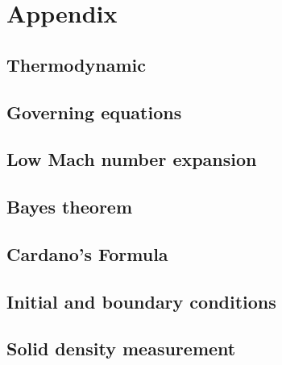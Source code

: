 \documentclass[a4paper,fleqn]{cas-dc}
\begin{document}
\clearpage
%



\clearpage \appendix \label{appendix}
\section{Appendix} 
\subsection{Thermodynamic}


\subsection{Governing equations}


\subsection{Low Mach number expansion} \label{CH:Low_Mach_chapter}
%


\subsection{Bayes theorem} \label{CH: Bayes}


\subsection{Cardano's Formula} \label{CH: Cardano}


\subsection{Initial and boundary conditions} \label{CH: IC_BC}


%

\subsection{Solid density measurement} \label{CH: Solid_Density_Measurment}
\end{document}
